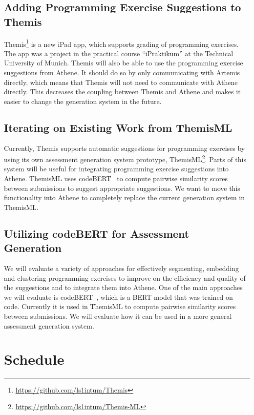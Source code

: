 \subsection*{Adding Programming Exercise Suggestions to Themis}

Themis\footnote{\url{https://github.com/ls1intum/Themis}} is a new iPad app, which supports grading of programming exercises. The app was a project in the practical course \enquote{iPraktikum} at the Technical University of Munich.
Themis will also be able to use the programming exercise suggestions from Athene. It should do so by only communicating with Artemis directly, which means that Themis will not need to communicate with Athene directly. This decreases the coupling between Themis and Athene and makes it easier to change the generation system in the future.

\subsection*{Iterating on Existing Work from ThemisML}
Currently, Themis supports automatic suggestions for programming exercises by using its own assessment generation system prototype, ThemisML\footnote{\url{https://github.com/ls1intum/Themis-ML}}.
Parts of this system will be useful for integrating programming exercise suggestions into Athene. ThemisML uses codeBERT~\cite{codeBERT} to compute pairwise similarity scores between submissions to suggest appropriate suggestions. We want to move this functionality into Athene to completely replace the current generation system in ThemisML.

\subsection*{Utilizing codeBERT for Assessment Generation}
We will evaluate a variety of approaches for effectively segmenting, embedding and clustering programming exercises to improve on the efficiency and quality of the suggestions and to integrate them into Athene.
One of the main approaches we will evaluate is codeBERT~\cite{codeBERT}, which is a BERT model that was trained on code. Currently it is used in ThemisML to compute pairwise similarity scores between submissions. We will evaluate how it can be used in a more general assessment generation system.


\section*{Schedule}

